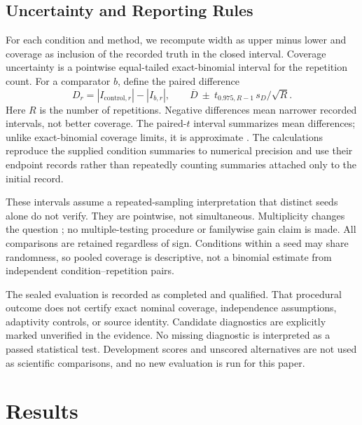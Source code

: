 \documentclass{article}
\begin{document}
\subsection{Uncertainty and Reporting Rules}
For each condition and method, we recompute width as upper minus lower and coverage as inclusion of the recorded truth in the closed interval. Coverage uncertainty is a pointwise equal-tailed exact-binomial interval for the repetition count. For a comparator $b$, define the paired difference
\begin{equation}
D_r=|I_{\mathrm{control},r}|-|I_{b,r}|,\qquad
\overline D\ \pm\ t_{0.975,R-1}\,s_D/\sqrt R.
\label{eq:paired}
\end{equation}
Here $R$ is the number of repetitions. Negative differences mean narrower recorded intervals, not better coverage. The paired-$t$ interval summarizes mean differences; unlike exact-binomial coverage limits, it is approximate \citep{Student1908}. The calculations reproduce the supplied condition summaries to numerical precision and use their endpoint records rather than repeatedly counting summaries attached only to the initial record.

These intervals assume a repeated-sampling interpretation that distinct seeds alone do not verify. They are pointwise, not simultaneous. Multiplicity changes the question \citep{BenjaminiHochberg1995}; no multiple-testing procedure or familywise gain claim is made. All comparisons are retained regardless of sign. Conditions within a seed may share randomness, so pooled coverage is descriptive, not a binomial estimate from independent condition--repetition pairs.

The sealed evaluation is recorded as completed and qualified. That procedural outcome does not certify exact nominal coverage, independence assumptions, adaptivity controls, or source identity. Candidate diagnostics are explicitly marked unverified in the evidence. No missing diagnostic is interpreted as a passed statistical test. Development scores and unscored alternatives are not used as scientific comparisons, and no new evaluation is run for this paper.

\section{Results}
\end{document}
